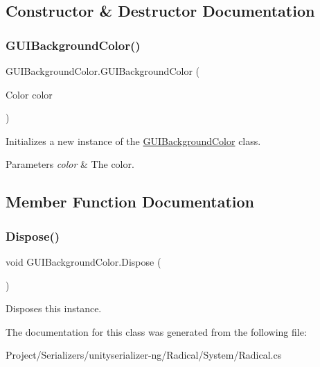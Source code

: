 \subsection{Constructor \& Destructor Documentation}
\mbox{\label{class_g_u_i_background_color_a0bbdf8b7ba29e00fe4587cef08e2dca0}} 
\subsubsection{\texorpdfstring{G\+U\+I\+Background\+Color()}{GUIBackgroundColor()}}
{\footnotesize\ttfamily G\+U\+I\+Background\+Color.\+G\+U\+I\+Background\+Color (\begin{DoxyParamCaption}\item[{Color}]{color }\end{DoxyParamCaption})\hspace{0.3cm}{\ttfamily [inline]}}



Initializes a new instance of the \hyperlink{class_g_u_i_background_color}{G\+U\+I\+Background\+Color} class. 


\begin{DoxyParams}{Parameters}
{\em color} & The color.\\
\hline
\end{DoxyParams}


\subsection{Member Function Documentation}
\mbox{\label{class_g_u_i_background_color_a7e11cea7ee2fafcd47a45982bb3cd1ab}} 
\subsubsection{\texorpdfstring{Dispose()}{Dispose()}}
{\footnotesize\ttfamily void G\+U\+I\+Background\+Color.\+Dispose (\begin{DoxyParamCaption}{ }\end{DoxyParamCaption})\hspace{0.3cm}{\ttfamily [inline]}}



Disposes this instance. 



The documentation for this class was generated from the following file\+:\begin{DoxyCompactItemize}
\item 
Project/\+Serializers/unityserializer-\/ng/\+Radical/\+System/Radical.\+cs\end{DoxyCompactItemize}
